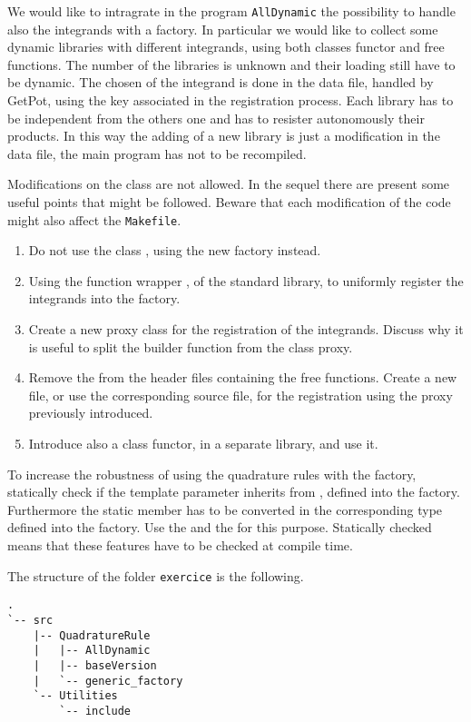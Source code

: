 
We would like to intragrate in the program \texttt{AllDynamic} the possibility
to handle also the integrands with a factory. In particular we would like to
collect some dynamic libraries with different integrands, using both classes
functor and free functions. The number of the libraries is unknown and their
loading still have to be dynamic. The chosen of the integrand is done in the
data file, handled by GetPot, using the key associated in the registration
process.  Each library has to be independent from the others one and has to
resister autonomously their products. In this way the adding of a new library is
just a modification in the data file, the main program has not to be recompiled.

Modifications on the class  are not allowed.
In the sequel there are present some useful points that might be followed.
Beware that each modification of the code might also affect the \texttt{Makefile}.

\begin{enumerate}

    \item Do not use the class , using the new factory
    instead.

    \item Using the function wrapper , of the standard
    library, to uniformly register the integrands into the factory.

    \item Create a new proxy class for the registration of the integrands.
    Discuss why it is useful to split the builder function from the class proxy.

    \item Remove the  from the header files containing the free
    functions. Create a new file, or use the corresponding source file,
    for the registration using the proxy previously introduced.

    \item Introduce also a class functor, in a separate library, and use it.

\end{enumerate}

To increase the robustness of using the quadrature rules with the factory,
statically check if the template parameter  inherits
from , defined into the factory. Furthermore the
static member  has to be converted in the corresponding type defined
into the factory. Use the  and the  for this
purpose. Statically checked means that these features have to be checked at
compile time.

The structure of the folder \texttt{exercice} is the following.
\begin{verbatim}
.
`-- src
    |-- QuadratureRule
    |   |-- AllDynamic
    |   |-- baseVersion
    |   `-- generic_factory
    `-- Utilities
        `-- include
\end{verbatim}
